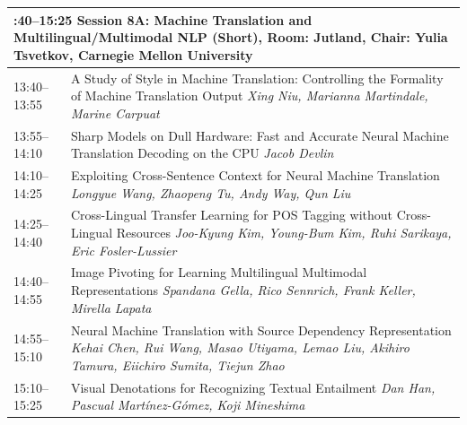 \documentclass{book}
\renewcommand{\large}{\fontsize{36}{40}\selectfont}
\begin{document}
\begin{tabular}{p{3in}p{16in}}
  \multicolumn{2}{p{\textwidth}}{\bfseries\large 13:40--15:25 Session 8A: Machine Translation and Multilingual/Multimodal NLP (Short), Room:  Jutland, Chair:  Yulia Tsvetkov, Carnegie Mellon University} \\\hline

    
    13:40--13:55
    &	A Study of Style in Machine Translation: Controlling the Formality of Machine Translation Output \newline 
    {\itshape Xing Niu, Marianna Martindale, Marine Carpuat} \\
    
    13:55--14:10
    &	Sharp Models on Dull Hardware: Fast and Accurate Neural Machine Translation Decoding on the CPU \newline 
    {\itshape Jacob Devlin} \\
    
    14:10--14:25
    &	Exploiting Cross-Sentence Context for Neural Machine Translation \newline 
    {\itshape Longyue Wang, Zhaopeng Tu, Andy Way, Qun Liu} \\
    
    14:25--14:40
    &	Cross-Lingual Transfer Learning for POS Tagging without Cross-Lingual Resources \newline 
    {\itshape Joo-Kyung Kim, Young-Bum Kim, Ruhi Sarikaya, Eric Fosler-Lussier} \\
    
    14:40--14:55
    &	Image Pivoting for Learning Multilingual Multimodal Representations \newline 
    {\itshape Spandana Gella, Rico Sennrich, Frank Keller, Mirella Lapata} \\
    
    14:55--15:10
    &	Neural Machine Translation with Source Dependency Representation \newline 
    {\itshape Kehai Chen, Rui Wang, Masao Utiyama, Lemao Liu, Akihiro Tamura, Eiichiro Sumita, Tiejun Zhao} \\
    
    15:10--15:25
    &	Visual Denotations for Recognizing Textual Entailment \newline 
    {\itshape Dan Han, Pascual Martínez-Gómez, Koji Mineshima} \\
    
\end{tabular}
\end{document}
